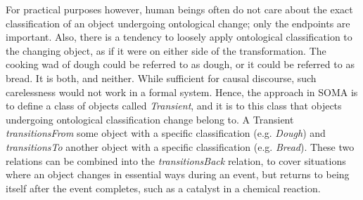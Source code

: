For practical purposes however, human beings often do not care about the exact classification of an object undergoing ontological change; only the endpoints are important. Also, there is a tendency to loosely apply ontological classification to the changing object, as if it were on either side of the transformation. The cooking wad of dough could be referred to as dough, or it could be referred to as bread. It is both, and neither. While sufficient for causal discourse, such carelessness would not work in a formal system. Hence, the approach in SOMA is to define a class of objects called \emph{Transient}, and it is to this class that objects undergoing ontological classification change belong to. A Transient \emph{transitionsFrom} some object with a specific classification (e.g. \emph{Dough}) and \emph{transitionsTo} another object with a specific classification (e.g. \emph{Bread}). These two relations can be combined into the \emph{transitionsBack} relation, to cover situations where an object changes in essential ways during an event, but returns to being itself after the event completes, such as a catalyst in a chemical reaction.
 

